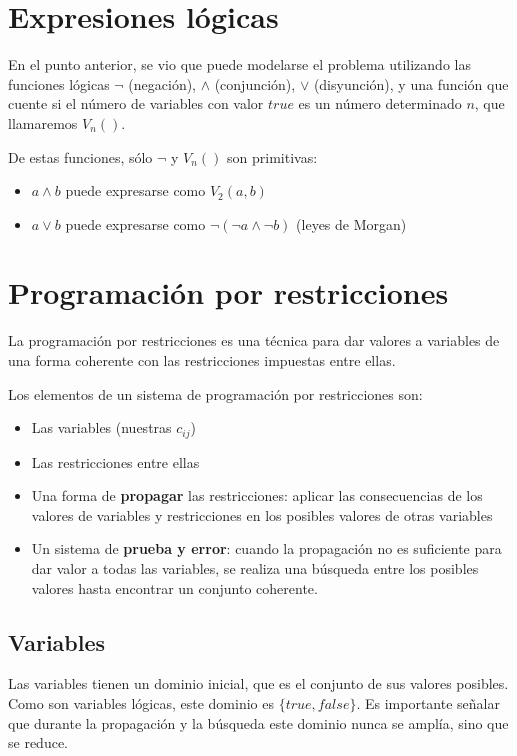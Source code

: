 \documentclass[11pt]{article}
\begin{document}
\section*{Expresiones lógicas}
\label{sec:org6cf409c}
En el punto anterior, se vio que puede modelarse el problema utilizando las funciones lógicas \(\lnot\) (negación), \(\land\) (conjunción), \(\lor\) (disyunción), y una función que cuente si el número de variables con valor \(true\) es un número determinado \(n\), que llamaremos \(V_n()\).

De estas funciones, sólo \(\lnot\) y \(V_n()\) son primitivas:
\begin{itemize}
\item \(a \land b\) puede expresarse como \(V_2(a,b)\)
\item \(a \lor b\) puede expresarse como \(\lnot( \lnot a \land \lnot b)\) (leyes de Morgan)
\end{itemize}

\section*{Programación por restricciones}
\label{sec:org7016a35}
La programación por restricciones es una técnica para dar valores a variables de una forma coherente con las restricciones impuestas entre ellas.

Los elementos de un sistema de programación por restricciones son:
\begin{itemize}
\item Las variables (nuestras \(c_{ij}\))
\item Las restricciones entre ellas
\item Una forma de \textbf{propagar} las restricciones: aplicar las consecuencias de los valores de variables y restricciones en los posibles valores de otras variables
\item Un sistema de \textbf{prueba y error}: cuando la propagación no es suficiente para dar valor a todas las variables, se realiza una búsqueda entre los posibles valores hasta encontrar un conjunto coherente.
\end{itemize}

\subsection*{Variables}
\label{sec:org34ec55b}
Las variables tienen un dominio inicial, que es el conjunto de sus valores posibles. Como son variables lógicas, este dominio es \(\{true,false\}\). Es importante señalar que durante la propagación y la búsqueda este dominio nunca se amplía, sino que se reduce. 
\end{document}
